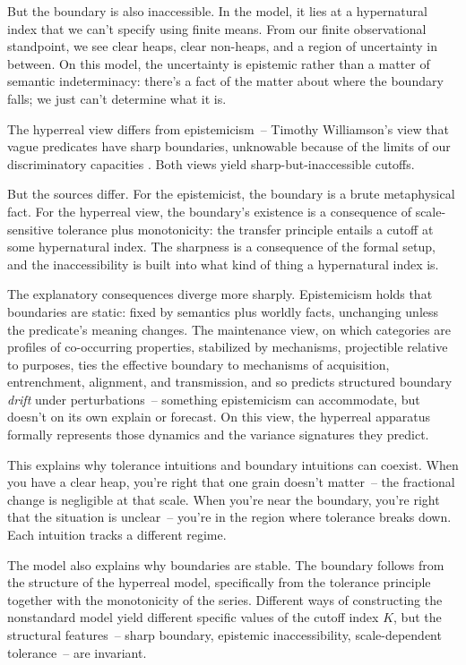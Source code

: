 But the boundary is also inaccessible. In the model, it lies at a hypernatural index that we can't specify using finite means. From our finite observational standpoint, we see clear heaps, clear non-heaps, and a region of uncertainty in between. On this model, the uncertainty is epistemic rather than a matter of semantic indeterminacy: there's a fact of the matter about where the boundary falls; we just can't determine what it is.

The hyperreal view differs from epistemicism~-- Timothy Williamson's view that vague predicates have sharp boundaries, unknowable because of the limits of our discriminatory capacities \citep{williamson1994}. Both views yield sharp-but-inaccessible cutoffs.

But the sources differ. For the epistemicist, the boundary is a brute metaphysical fact. For the hyperreal view, the boundary's existence is a consequence of scale-sensitive tolerance plus monotonicity: the transfer principle entails a cutoff at some hypernatural index. The sharpness is a consequence of the formal setup, and the inaccessibility is built into what kind of thing a hypernatural index is.

The explanatory consequences diverge more sharply. Epistemicism holds that boundaries are static: fixed by semantics plus worldly facts, unchanging unless the predicate's meaning changes. The maintenance view, on which categories are profiles of co-occurring properties, stabilized by mechanisms, projectible relative to purposes, ties the effective boundary to mechanisms of acquisition, entrenchment, alignment, and transmission, and so predicts structured boundary \emph{drift} under perturbations~-- something epistemicism can accommodate, but doesn't on its own explain or forecast. On this view, the hyperreal apparatus formally represents those dynamics and the variance signatures they predict.

This explains why tolerance intuitions and boundary intuitions can coexist. When you have a clear heap, you're right that one grain doesn't matter~-- the fractional change is negligible at that scale. When you're near the boundary, you're right that the situation is unclear~-- you're in the region where tolerance breaks down. Each intuition tracks a different regime.

The model also explains why boundaries are stable. The boundary follows from the structure of the hyperreal model, specifically from the tolerance principle together with the monotonicity of the series. Different ways of constructing the nonstandard model yield different specific values of the cutoff index $K$, but the structural features~-- sharp boundary, epistemic inaccessibility, scale-dependent tolerance~-- are invariant.

